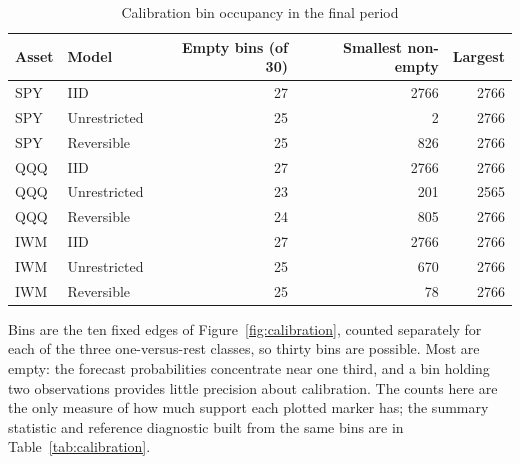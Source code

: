 \begin{table}[!htbp]\centering\small\setlength{\tabcolsep}{8pt}
\caption{Calibration bin occupancy in the final period}\label{tab:bins}
\begin{tabular}{llrrr}\toprule
Asset & Model & Empty bins (of 30) & Smallest non-empty & Largest\\\midrule
SPY & IID & 27 & 2766 & 2766\\
SPY & Unrestricted & 25 & 2 & 2766\\
SPY & Reversible & 25 & 826 & 2766\\
\midrule
QQQ & IID & 27 & 2766 & 2766\\
QQQ & Unrestricted & 23 & 201 & 2565\\
QQQ & Reversible & 24 & 805 & 2766\\
\midrule
IWM & IID & 27 & 2766 & 2766\\
IWM & Unrestricted & 25 & 670 & 2766\\
IWM & Reversible & 25 & 78 & 2766\\
\bottomrule\end{tabular}
\par\smallskip\parbox{0.98\linewidth}{\footnotesize Bins are the ten fixed edges of Figure~\ref{fig:calibration}, counted separately for each of the three one-versus-rest classes, so thirty bins are possible. Most are empty: the forecast probabilities concentrate near one third, and a bin holding two observations provides little precision about calibration. The counts here are the only measure of how much support each plotted marker has; the summary statistic and reference diagnostic built from the same bins are in Table~\ref{tab:calibration}.}
\end{table}
